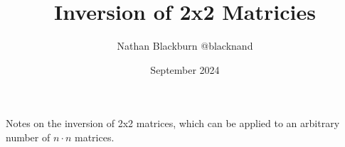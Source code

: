 \documentclass[options]{article}
\title{Inversion of 2x2 Matricies}
\author{Nathan Blackburn {@blacknand}}
\date{September 2024}
\begin{document}
\maketitle
Notes on the inversion of 2x2 matrices, which can be applied to an arbitrary number of \( n \cdot n \) matrices.
\end{document}
